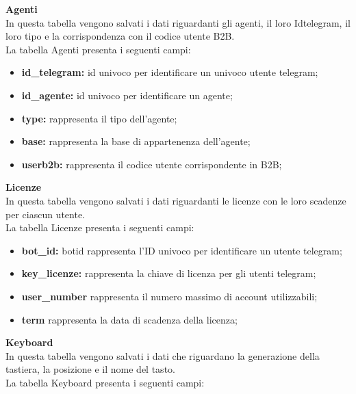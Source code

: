 \textbf{Agenti}\\

In questa tabella vengono salvati i dati riguardanti gli agenti, il loro Idtelegram, il loro tipo e la corrispondenza con il codice utente B2B.\\

La tabella Agenti presenta i seguenti campi:\\

\begin{itemize}
\item \textbf{id\_telegram:}  id univoco per identificare un univoco utente telegram;
\item \textbf{id\_agente:}  id univoco per identificare un agente;
\item \textbf{type:} rappresenta il tipo dell'agente;
\item \textbf{base:} rappresenta la base di appartenenza dell'agente;
\item \textbf{userb2b:} rappresenta il codice utente corrispondente in B2B;
\end{itemize}



\textbf{Licenze}
\\
In questa tabella vengono salvati i dati riguardanti le licenze con le loro scadenze per ciascun utente.\\

La tabella Licenze presenta i seguenti campi:

\begin{itemize}
\item \textbf{bot\_id:}  botid rappresenta l'ID univoco per identificare un utente telegram;
\item \textbf{key\_licenze:} rappresenta la chiave di licenza per gli utenti telegram;
\item \textbf{user\_number } rappresenta il numero massimo di account utilizzabili;
\item \textbf{term} rappresenta la data di scadenza della licenza;
\end{itemize}




\textbf{Keyboard}\\

In questa tabella vengono salvati i dati che riguardano la generazione della tastiera, la posizione e il nome del tasto.\\

La tabella Keyboard presenta i seguenti campi:\\

